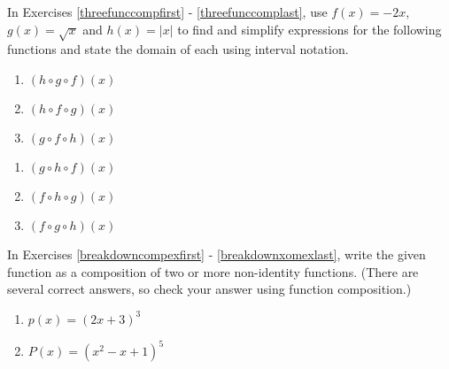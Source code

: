 \pagebreak

In Exercises \ref{threefunccompfirst} - \ref{threefunccomplast}, use $f(x) = -2x$, $g(x) = \sqrt{x}$ and $h(x) = |x|$ to find and simplify expressions for the following functions and state the domain of each using interval notation.

\begin{multicols}{3}

\begin{enumerate}
\setcounter{enumi}{\value{HW}}

\item $(h\circ g \circ f)(x)$ \label{threefunccompfirst}

\item $(h\circ f \circ g)(x)$

\item $(g\circ f \circ h)(x)$

\setcounter{HW}{\value{enumi}}
\end{enumerate}
\end{multicols}

\begin{multicols}{3}
\begin{enumerate}
\setcounter{enumi}{\value{HW}}

\item $(g\circ h \circ f)(x)$ 

\item $(f\circ h \circ g)(x)$

\item $(f\circ g \circ h)(x)$ \label{threefunccomplast}

\setcounter{HW}{\value{enumi}}
\end{enumerate}
\end{multicols}

In Exercises \ref{breakdowncompexfirst} - \ref{breakdownxomexlast},  write the given function as a composition of two or more non-identity functions.  (There are several correct answers, so check your answer using function composition.)

\begin{multicols}{2}
\begin{enumerate}
\setcounter{enumi}{\value{HW}}

\item  $p(x) = (2x+3)^3$ \label{breakdowncompexfirst}
\item  $P(x) = \left(x^2-x+1\right)^5$

\setcounter{HW}{\value{enumi}}
\end{enumerate}
\end{multicols}

